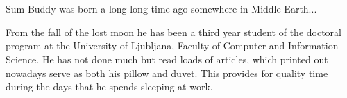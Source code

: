 \graphicspath{{img/}}










\appendix
\section{\biographyname}
Sum Buddy was born a long long time ago somewhere in Middle Earth...

From the fall of the lost moon he has been a third year student of the doctoral program at the University of Ljubljana, Faculty of Computer and Information Science. He has not done much but read loads of articles, which printed out nowadays serve as both his pillow and duvet. This provides for quality time during the days that he spends sleeping at work.

